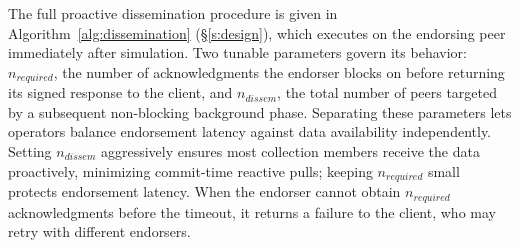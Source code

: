 The full proactive dissemination procedure is given in Algorithm~\ref{alg:dissemination} (\S\ref{s:design}), which executes on the endorsing peer immediately after simulation. Two tunable parameters govern its behavior: $n_{required}$, the number of acknowledgments the endorser blocks on before returning its signed response to the client, and $n_{dissem}$, the total number of peers targeted by a subsequent non-blocking background phase. Separating these parameters lets operators balance endorsement latency against data availability independently. Setting $n_{dissem}$ aggressively ensures most collection members receive the data proactively, minimizing commit-time reactive pulls; keeping $n_{required}$ small protects endorsement latency. When the endorser cannot obtain $n_{required}$ acknowledgments before the timeout, it returns a failure to the client, who may retry with different endorsers.
